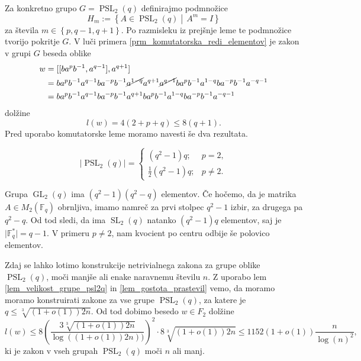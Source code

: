     Za konkretno grupo $G = \operatorname{PSL}_2(q)$ definirajmo podmnožice \begin{equation*}
        H_m := \left\{ A \in \operatorname{PSL}_2(q)  \middle|\,  A^{m} = I \right\}
    \end{equation*}  
       za števila $m \in \left\{ p, q-1 , q+1\right\}$.
    Po razmisleku iz prejšnje leme te podmnožice tvorijo pokritje $G$. V luči primera \ref{prm_komutatorska_redi_elementov} je zakon v grupi $G$ beseda oblike \begin{align*}
        w &= [[b a^{p} b^{-1}, a^{q-1}], a^{q + 1}]  \\
         &= b a^{p} b^{-1} a^{q-1} b a^{-p} b^{-1} \cancel{ a^{1 - q}} a^{q + 1} \cancel{a^{q -1}} b a^{p} b^{-1} a^{1 - q} b a^{-p} b^{-1} a^{- q - 1} \\ 
         &= b a^{p} b^{-1} a^{q-1} b a^{-p} b^{-1}  a^{q + 1}  b a^{p} b^{-1} a^{1 - q} b a^{-p} b^{-1} a^{- q - 1} 
    \end{align*}  
    dolžine \begin{equation*} 
    l(w) = 4(2 + p + q) \le 8(q + 1). 
    \end{equation*}
    Pred uporabo komutatorske leme moramo navesti še dva rezultata.
    \begin{lema}
    \label{lem_velikost_grupe_psl2q}
    \begin{equation*}
        \lvert \operatorname{PSL}_2(q) \rvert   = \begin{cases}
            (q^2 - 1) q; & p = 2,  \\
            \frac{1}{2} (q^2 - 1) q ; & p \neq 2.
        \end{cases}
     \end{equation*} 
    \end{lema}
    \begin{dokaz}
    Grupa $\operatorname{GL}_2(q)$ ima $(q^2  -1)(q^2 - q)$ elementov. Če hočemo, da je matrika $A \in M_2(\mathbb{F}_q)$ obrnljiva, imamo namreč za prvi stolpec $q^2 -1$ izbir, za drugega pa $q^2 - q$.
    Od tod sledi, da ima $\operatorname{SL}_2(q)$ natanko $(q^2  -1)q$ elementov, saj je $\lvert \mathbb{F}_q^{*} \rvert = q-1$. V primeru $p \neq 2$, nam kvocient po centru odbije še polovico elementov.   
    \end{dokaz}
    
    Zdaj se lahko lotimo konstrukcije netrivialnega zakona za grupe oblike $\operatorname{PSL}_2(q)$, moči manjše ali enake naravnemu številu $n$. Z uporabo lem \ref{lem_velikost_grupe_psl2q} in \ref{lem_gostota_prastevil}
    vemo, da moramo moramo konstruirati zakone za vse grupe $\operatorname{PSL}_2(q)$, za katere je $q \le \sqrt[3]{(1 + o(1)) 2n}$. Od tod dobimo besedo $w \in F_2$ dolžine \begin{equation*}
    l(w) \le 8 \left( \frac{3 \sqrt[3]{(1 + o(1)) 2n}}{\log((1 + o(1)) 2n))}  \right)^2 \cdot 8 \sqrt[3]{(1 + o(1)) 2n} \le 1152 (1 + o(1)) \frac{n}{\log(n)^2},
    \end{equation*}  
    ki je zakon v vseh grupah $\operatorname{PSL}_2(q)$ moči $n$ ali manj. 
    
